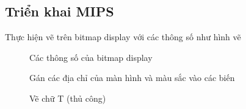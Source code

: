 \documentclass[a4paper,12pt]{article}
\begin{document}
\subsection{Triển khai MIPS}
Thực hiện vẽ trên bitmap display với các thông số như hình vẽ 
\FloatBarrier
\begin{figure}[ht!]
	\centerline{}
	\caption{Các thông số của bitmap display}
	\label{fig:ass1}
\end{figure}
\FloatBarrier
\begin{figure}[ht!]
	\centerline{}
	\caption{Gán các địa chỉ của màn hình và màu sắc vào các biến}
	\label{fig:ass1}
\end{figure}
\FloatBarrier
\begin{figure}[ht!]
	\centerline{}
	\caption{Vẽ chữ T (thủ công)}
	\label{fig:ass1}
\end{figure}
\end{document}
